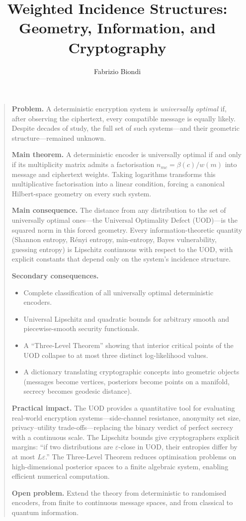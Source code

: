 \documentclass[12pt,a4paper]{book}
\title{Weighted Incidence Structures: Geometry, Information, and Cryptography}
\author{Fabrizio Biondi}
\theoremstyle{plain}
\begin{document}
\frontmatter
\maketitle
\vfill
\begin{quote}\small
\noindent\textbf{Problem.}  A deterministic encryption system is \emph{universally optimal}
if, after observing the ciphertext, every compatible message is equally likely.
Despite decades of study, the full set of such systems---and their
geometric structure---remained unknown.

\medskip
\noindent\textbf{Main theorem.}  A deterministic encoder is universally optimal if and only
if its multiplicity matrix admits a factorisation $n_{mc}=\beta(c)/w(m)$ into
message and ciphertext weights.  Taking logarithms transforms this
multiplicative factorisation into a linear condition, forcing a canonical
Hilbert-space geometry on every such system.

\medskip
\noindent\textbf{Main consequence.}  The distance from any distribution to the set of
universally optimal ones---the Universal Optimality Defect (UOD)---is the
squared norm in this forced geometry.  Every information-theoretic quantity
(Shannon entropy, R\'enyi entropy, min-entropy, Bayes vulnerability,
guessing entropy) is Lipschitz continuous with respect to the UOD, with
explicit constants that depend only on the system's incidence structure.

\medskip
\noindent\textbf{Secondary consequences.}
\begin{itemize}
\item Complete classification of all universally optimal deterministic encoders.
\item Universal Lipschitz and quadratic bounds for arbitrary smooth and
piecewise-smooth security functionals.
\item A ``Three-Level Theorem'' showing that interior critical points of
the UOD collapse to at most three distinct log-likelihood values.
\item A dictionary translating cryptographic concepts into geometric objects
(messages become vertices, posteriors become points on a manifold,
secrecy becomes geodesic distance).
\end{itemize}

\medskip
\noindent\textbf{Practical impact.}
The UOD provides a quantitative tool for evaluating real-world encryption
systems---side-channel resistance, anonymity set size, privacy--utility
trade-offs---replacing the binary verdict of perfect secrecy with a
continuous scale.  The Lipschitz bounds give cryptographers explicit
margins: ``if two distributions are $\varepsilon$-close in UOD, their
entropies differ by at most $L\varepsilon$.''  The Three-Level Theorem
reduces optimisation problems on high-dimensional posterior spaces to
a finite algebraic system, enabling efficient numerical computation.

\medskip
\noindent\textbf{Open problem.}  Extend the theory from deterministic to randomised
encoders, from finite to continuous message spaces, and from classical
to quantum information.
\end{quote}
\end{document}
